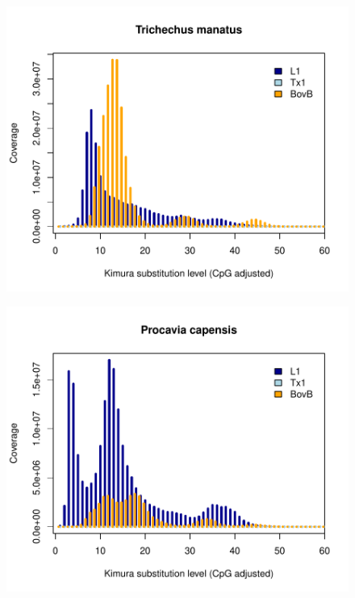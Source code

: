 \documentclass[12pt,a4paper,times]{article}
\begin{document}
\begin{figure}[H]
	\centering
	\includegraphics[scale=0.8]{suppFigures/divergencePlots/Trichechus_manatus.pdf}
	\caption{\label{Trichchus}}
\end{figure}

\begin{figure}[H]
	\centering
	\includegraphics[scale=0.8]{suppFigures/divergencePlots/Procavia_capensis.pdf}
	\caption{\label{Procavia}}
\end{figure}
\end{document}

